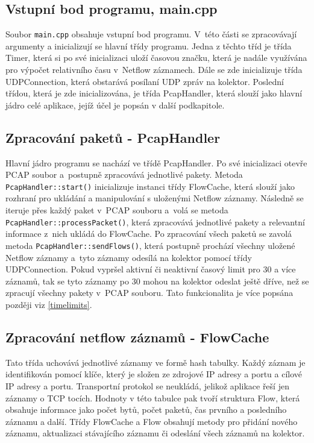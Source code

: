 \documentclass[a4paper, 11pt]{article}
\begin{document}
\begin{sloppypar}
\subsection{Vstupní bod programu, main.cpp}
Soubor \texttt{main.cpp} obsahuje vstupní bod programu. V~této části se zpracovávají argumenty a inicializují se hlavní třídy programu. Jedna z těchto tříd je třída Timer, která si po své inicializaci uloží časovou značku, která je nadále využívána pro výpočet relativního času v~Netflow záznamech. Dále se zde inicializuje třída UDPConnection, která obstarává posílaní UDP zpráv na kolektor. Poslední třídou, která je zde inicializována, je třída PcapHandler, která slouží jako hlavní jádro celé aplikace, jejíž účel je popsán v další podkapitole.
\subsection{Zpracování paketů - PcapHandler}
Hlavní jádro programu se nachází ve třídě PcapHandler. Po své inicializaci otevře PCAP soubor a~postupně zpracovává jednotlivé pakety. Metoda \texttt{PcapHandler::start()} inicializuje instanci třídy FlowCache, která slouží jako rozhraní pro ukládání a manipulování s uloženými Netflow záznamy. Následně se iteruje přes každý paket v~PCAP souboru a~volá se metoda \texttt{PcapHandler::processPacket()}, která zpracovává jednotlivé pakety a relevantní informace z~nich ukládá do FlowCache. Po zpracování všech paketů se zavolá metoda \texttt{PcapHandler::sendFlows()}, která postupně prochází všechny uložené Netflow záznamy a~tyto záznamy odesílá na kolektor pomocí třídy UDPConnection. Pokud vypršel aktivní či neaktivní časový limit pro 30 a více záznamů, tak se tyto záznamy po 30 mohou na kolektor odeslat ještě dříve, než se zpracují všechny pakety v~PCAP souboru. Tato funkcionalita je více popsána později viz \ref{timelimits}.

\subsection{Zpracování netflow záznamů - FlowCache}
Tato třída uchovává jednotlivé záznamy ve formě hash tabulky. Každý záznam je identifikován pomocí klíče, který je složen ze zdrojové IP adresy a portu a cílové IP adresy a portu. Transportní protokol se neukládá, jelikož aplikace řeší jen záznamy o TCP tocích. Hodnoty v této tabulce pak tvoří struktura Flow, která obsahuje informace jako počet bytů, počet paketů, čas prvního a posledního záznamu a další. Třídy FlowCache a Flow obsahují metody pro přidání nového záznamu, aktualizaci stávajícího záznamu či odeslání všech záznamů na kolektor.


\end{sloppypar}
\end{document}
